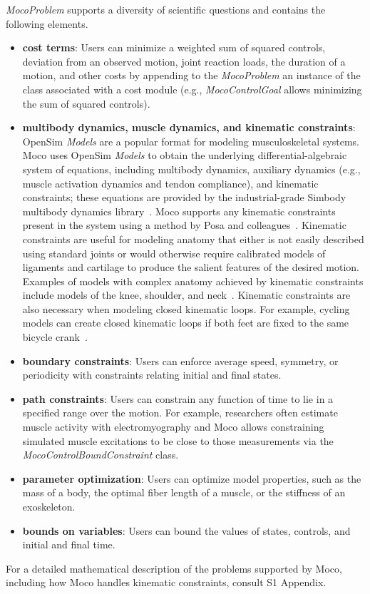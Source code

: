 \documentclass[10pt,letterpaper]{article}
\begin{document}
\textit{MocoProblem} supports a diversity of scientific questions and contains the following elements.
\begin{itemize}
\item \textbf{cost terms}: Users can minimize a weighted sum of squared controls, deviation from an observed motion, joint reaction loads, the duration of a motion, and other costs by appending to the \textit{MocoProblem} an instance of the class associated with a cost module (e.g., \textit{MocoControlGoal} allows minimizing the sum of squared controls).
\item \textbf{multibody dynamics, muscle dynamics, and kinematic constraints}:\\OpenSim \textit{Models} are a popular format for modeling musculoskeletal systems. Moco uses OpenSim \textit{Models} to obtain the underlying differential-algebraic system of equations, including multibody dynamics, auxiliary dynamics (e.g., muscle activation dynamics and tendon compliance), and kinematic constraints; these equations are provided by the industrial-grade Simbody multibody dynamics library~\cite{Sherman:2011byc}. Moco supports any kinematic constraints present in the system using a method by Posa and colleagues~\cite{Posa:2016}. Kinematic constraints are useful for modeling anatomy that either is not easily described using standard joints or would otherwise require calibrated models of ligaments and cartilage to produce the salient features of the desired motion. Examples of models with complex anatomy achieved by kinematic constraints include models of the knee, shoulder, and neck~\cite{Seth:2016,Lerner:2015,Rajagopal:2016ek,Cazzola:2017}. Kinematic constraints are also necessary when modeling closed kinematic loops. For example, cycling models can create closed kinematic loops if both feet are fixed to the same bicycle crank~\cite{Jansen:2020}.
\item \textbf{boundary constraints}: Users can enforce average speed, symmetry, or periodicity with constraints relating initial and final states.
\item \textbf{path constraints}: Users can constrain any function of time to lie in a specified range over the motion. For example, researchers often estimate muscle activity with electromyography and Moco allows constraining simulated muscle excitations to be close to those measurements via the \textit{MocoControlBoundConstraint} class.
\item \textbf{parameter optimization}: Users can optimize model properties, such as the mass of a body, the optimal fiber length of a muscle, or the stiffness of an exoskeleton.
\item \textbf{bounds on variables}: Users can bound the values of states, controls, and initial and final time.
\end{itemize}
For a detailed mathematical description of the problems supported by Moco, including how Moco handles kinematic constraints, consult S1 Appendix.
\end{document}
